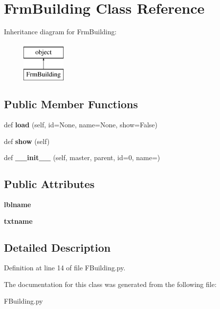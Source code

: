 \hypertarget{class_f_building_1_1_frm_building}{}\section{Frm\+Building Class Reference}
\label{class_f_building_1_1_frm_building}
Inheritance diagram for Frm\+Building\+:\begin{figure}[H]
\begin{center}
\leavevmode
\includegraphics[height=2.000000cm]{class_f_building_1_1_frm_building}
\end{center}
\end{figure}
\subsection*{Public Member Functions}
\begin{DoxyCompactItemize}
\item 
\mbox{\label{class_f_building_1_1_frm_building_a72f6c394e1999939f9d9b5580c86dcc2}} 
def {\bfseries load} (self, id=None, name=None, show=False)
\item 
\mbox{\label{class_f_building_1_1_frm_building_ab4f4398c3f210fe4ea6e720401357691}} 
def {\bfseries show} (self)
\item 
\mbox{\label{class_f_building_1_1_frm_building_a9ad70aa10f26bd59d99d7abb5abb7565}} 
def {\bfseries \+\_\+\+\_\+init\+\_\+\+\_\+} (self, master, parent, id=0, name=\textquotesingle{}\textquotesingle{})
\end{DoxyCompactItemize}
\subsection*{Public Attributes}
\begin{DoxyCompactItemize}
\item 
\mbox{\label{class_f_building_1_1_frm_building_afe9b98e5038ae1c69e5bb7eef0ed7cc4}} 
{\bfseries lblname}
\item 
\mbox{\label{class_f_building_1_1_frm_building_a24025fc9f698a9db8fb4f3c1c3c32e40}} 
{\bfseries txtname}
\end{DoxyCompactItemize}


\subsection{Detailed Description}


Definition at line 14 of file F\+Building.\+py.



The documentation for this class was generated from the following file\+:\begin{DoxyCompactItemize}
\item 
F\+Building.\+py\end{DoxyCompactItemize}
